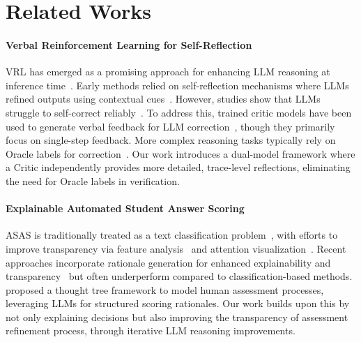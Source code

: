 \section{Related Works}
\paragraph{Verbal Reinforcement Learning for Self-Reflection}
VRL has emerged as a promising approach for enhancing LLM reasoning at inference time~\cite{Huang2023LargeLM, kamoi-etal-2024-llms}. Early methods relied on self-reflection mechanisms where LLMs refined outputs using contextual cues~\cite{chen2024teaching, jiang-etal-2023-active, welleck2023generating}. However, studies show that LLMs struggle to self-correct reliably~\cite{li-etal-2024-hindsight, tyen-etal-2024-llms, chen2024can, kamoi2024evaluating}. To address this, trained critic models have been used to generate verbal feedback for LLM correction~\cite{welleck2023generating, akyurek-etal-2023-rl4f, paul-etal-2024-refiner}, though they primarily focus on single-step feedback. More complex reasoning tasks typically rely on Oracle labels for correction~\cite{shinn2023reflexion, kim2023language}. Our work introduces a dual-model framework where a Critic independently provides more detailed, trace-level reflections, eliminating the need for Oracle labels in verification.

\paragraph{Explainable Automated Student Answer Scoring}
ASAS is traditionally treated as a text classification problem~\cite{grading_classification, taghipour-ng-2016-neural}, with efforts to improve transparency via feature analysis~\cite{dong-zhang-2016-automatic, bert_feature, li-uncertainty-interpretation,zhou-etal-2024-mystery} and attention visualization~\cite{helen-aes-2016, yang-etal-2020-enhancing}. Recent approaches incorporate rationale generation for enhanced explainability and transparency~\cite{li_emnlp2023} but often underperform compared to classification-based methods. \citet{li_emnlp2024, aaai_demo} proposed a thought tree framework to model human assessment processes, leveraging LLMs for structured scoring rationales. Our work builds upon this by not only explaining decisions but also improving the transparency of assessment refinement process, through iterative LLM reasoning improvements.